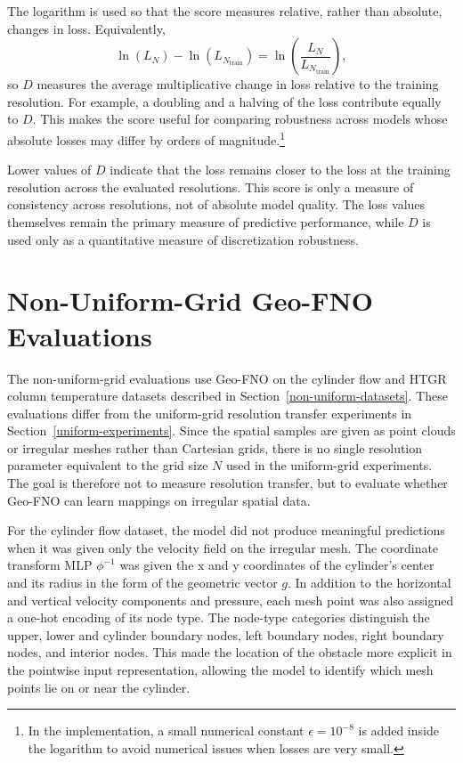 The logarithm is used so that the score measures relative, rather than absolute, changes in loss. Equivalently,
\[
\ln(L_N)-\ln(L_{N_{\mathrm{train}}})
=
\ln\left(\frac{L_N}{L_{N_{\mathrm{train}}}}\right),
\]
so \(D\) measures the average multiplicative change in loss relative to the training resolution. For example, a doubling and a halving of the loss contribute equally to \(D\). This makes the score useful for comparing robustness across models whose absolute losses may differ by orders of magnitude.\footnote{In the implementation, a small numerical constant \(\epsilon=10^{-8}\) is added inside the logarithm to avoid numerical issues when losses are very small.}

Lower values of \(D\) indicate that the loss remains closer to the loss at the training resolution across the evaluated resolutions. This score is only a measure of consistency across resolutions, not of absolute model quality. The loss values themselves remain the primary measure of predictive performance, while \(D\) is used only as a quantitative measure of discretization robustness.


\section{Non-Uniform-Grid Geo-FNO Evaluations}\label{non-uniform-experiments}

The non-uniform-grid evaluations use Geo-FNO on the cylinder flow and
HTGR column temperature datasets described in
Section~\ref{non-uniform-datasets}. These evaluations differ from the
uniform-grid resolution transfer experiments in
Section~\ref{uniform-experiments}. Since the spatial samples are given
as point clouds or irregular meshes rather than Cartesian grids, there
is no single resolution parameter equivalent to the grid size $N$ used
in the uniform-grid experiments. The goal is therefore not to measure
resolution transfer, but to evaluate whether Geo-FNO can learn mappings
on irregular spatial data.

For the cylinder flow dataset, the model did not produce meaningful
predictions when it was given only the velocity field on the irregular
mesh. The coordinate transform MLP $\phi^{-1}$ was given the x and y coordinates of the cylinder's center and its radius in the form of the geometric vector $g$. In addition to the horizontal and vertical velocity
components and pressure, each mesh point was also assigned a one-hot encoding of its node
type. The node-type categories distinguish the upper, lower and cylinder boundary nodes, left boundary nodes, right boundary nodes, and interior nodes. This made the location of the obstacle more
explicit in the pointwise input representation, allowing the model to
identify which mesh points lie on or near the cylinder.

